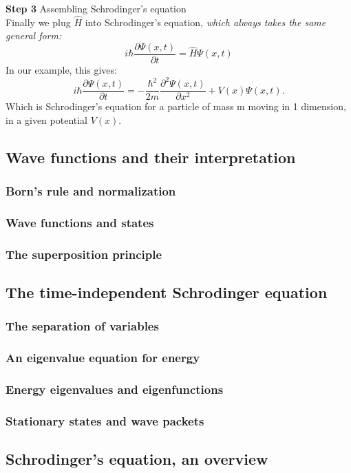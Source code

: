 \documentclass{article}
\begin{document}
\textbf{Step 3} Assembling Schrodinger's equation\\
Finally we plug $\hat{H}$ into Schrodinger's equation, \emph{which always takes the same general form:}
$$ i \hbar\frac{\partial\Psi(x,t)}{\partial t} = \hat{H}\Psi(x,t) $$
In our example, this gives:
$$ i \hbar\frac{\partial\Psi(x,t)}{\partial t} = - \frac{\hbar^2}{2m} \frac{\partial^2 \Psi(x,t)}{\partial x^2} + V(x)\Psi(x,t). $$
Which is Schrodinger's equation for a particle of mass m moving in 1 dimension, in a given potential $V(x)$.

\subsection{Wave functions and their interpretation}
\subsubsection{Born's rule and normalization}
\subsubsection{Wave functions and states}
\subsubsection{The superposition principle}
\subsection{The time-independent Schrodinger equation}
\subsubsection{The separation of variables}
\subsubsection{An eigenvalue equation for energy}
\subsubsection{Energy eigenvalues and eigenfunctions}
\subsubsection{Stationary states and wave packets}
\subsection{Schrodinger's equation, an overview}
\end{document}
